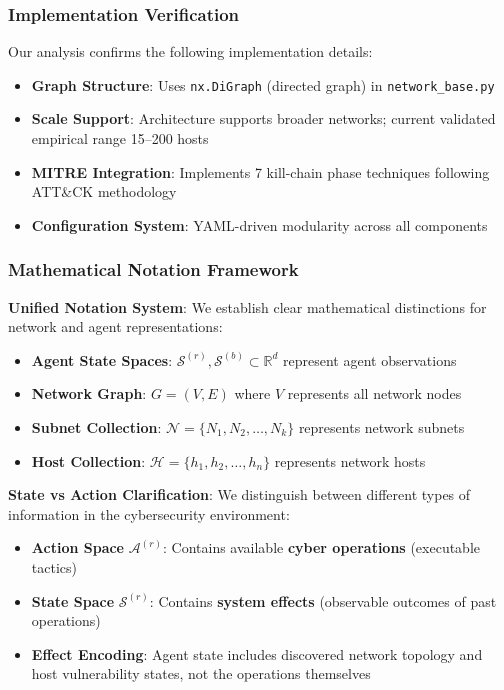 \documentclass[12pt]{article}
\newcounter{phase}[algorithm]
\theoremstyle{definition}
\theoremstyle{plain}
\begin{document}
\subsubsection{Implementation Verification}
Our analysis confirms the following implementation details:
\begin{itemize}
    \item \textbf{Graph Structure}: Uses \texttt{nx.DiGraph} (directed graph) in \texttt{network\_base.py}
    \item \textbf{Scale Support}: Architecture supports broader networks; current validated empirical range 15--200 hosts
    \item \textbf{MITRE Integration}: Implements 7 kill-chain phase techniques following ATT\&CK methodology
    \item \textbf{Configuration System}: YAML-driven modularity across all components
\end{itemize}

\subsubsection{Mathematical Notation Framework}

\textbf{Unified Notation System}: We establish clear mathematical distinctions for network and agent representations:

\begin{itemize}
\item \textbf{Agent State Spaces}: $\mathcal{S}^{(r)}, \mathcal{S}^{(b)} \subset \mathbb{R}^{d}$ represent agent observations
\item \textbf{Network Graph}: $G = (V, E)$ where $V$ represents all network nodes  
\item \textbf{Subnet Collection}: $\mathcal{N} = \{N_1, N_2, \ldots, N_k\}$ represents network subnets
\item \textbf{Host Collection}: $\mathcal{H} = \{h_1, h_2, \ldots, h_n\}$ represents network hosts
\end{itemize}

\textbf{State vs Action Clarification}: We distinguish between different types of information in the cybersecurity environment:
\begin{itemize}
\item \textbf{Action Space} $\mathcal{A}^{(r)}$: Contains available \textbf{cyber operations} (executable tactics)
\item \textbf{State Space} $\mathcal{S}^{(r)}$: Contains \textbf{system effects} (observable outcomes of past operations)  
\item \textbf{Effect Encoding}: Agent state includes discovered network topology and host vulnerability states, not the operations themselves
\end{itemize}
\end{document}
